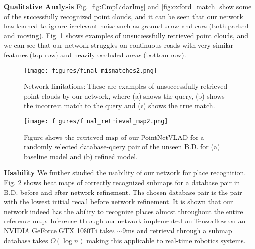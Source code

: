 \documentclass[10pt,twocolumn,letterpaper]{article}
\begin{document}
\vspace{-0.2cm}
\noindent\textbf{Qualitative Analysis} Fig. \ref{fig:CmpLidarImg} and \ref{fig:oxford_match} show some of the successfully recognized point clouds, and it can be seen that our network has learned to ignore irrelevant noise such as ground snow and cars (both parked and moving). Fig. \ref{fig:mismatch} shows examples of unsuccessfully retrieved point clouds, and we can see that our network struggles on continuous roads with very similar features (top row) and heavily occluded areas (bottom row). 
\newline
\begin{figure}[t]
	\begin{center}
\texttt{[image: figures/final\_mismatches2.png]}
	\end{center}
	\vspace{-0.4cm}
	\caption{Network limitations: These are examples of unsuccessfully retrieved point clouds by our network, where (a) shows the query, (b) shows the incorrect match to the query and (c) shows the true match.\vspace{-0.2cm}}
	\label{fig:mismatch}
\end{figure}
\begin{figure}[t]
	\begin{center}
\texttt{[image: figures/final\_retrieval\_map2.png]}
	\end{center}
	\vspace{-0.4cm}
	\caption{Figure shows the retrieved map of our PointNetVLAD for a randomly selected database-query pair of the unseen B.D. for (a) baseline model and (b) refined model.\vspace{-0.3cm}}
	\label{fig:map}
\end{figure}

\vspace{-0.2cm}
\noindent\textbf{Usability} We further studied the usability of our network for place recognition. Fig. \ref{fig:map} shows heat maps of correctly recognized submaps for a database pair in B.D. before and after network refinement. The chosen database pair is the pair with the lowest initial recall before network refinement. It is shown that our network indeed has the ability to recognize places almost throughout the entire reference map. Inference through our network implemented on Tensorflow\cite{45381} on an NVIDIA GeForce GTX 1080Ti takes $\sim9$ms and retrieval through a submap database takes $O(\log n)$ making this applicable to real-time robotics systems.
\newline
\end{document}
